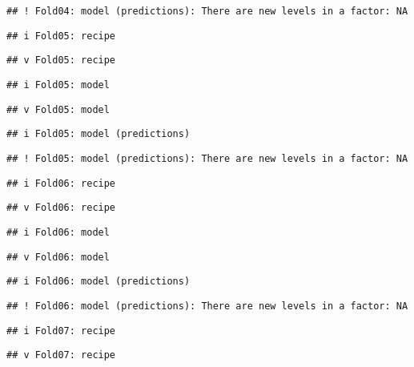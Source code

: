 \documentclass[
]{article}
\begin{document}
\begin{verbatim}
## ! Fold04: model (predictions): There are new levels in a factor: NA
\end{verbatim}

\begin{verbatim}
## i Fold05: recipe
\end{verbatim}

\begin{verbatim}
## v Fold05: recipe
\end{verbatim}

\begin{verbatim}
## i Fold05: model
\end{verbatim}

\begin{verbatim}
## v Fold05: model
\end{verbatim}

\begin{verbatim}
## i Fold05: model (predictions)
\end{verbatim}

\begin{verbatim}
## ! Fold05: model (predictions): There are new levels in a factor: NA
\end{verbatim}

\begin{verbatim}
## i Fold06: recipe
\end{verbatim}

\begin{verbatim}
## v Fold06: recipe
\end{verbatim}

\begin{verbatim}
## i Fold06: model
\end{verbatim}

\begin{verbatim}
## v Fold06: model
\end{verbatim}

\begin{verbatim}
## i Fold06: model (predictions)
\end{verbatim}

\begin{verbatim}
## ! Fold06: model (predictions): There are new levels in a factor: NA
\end{verbatim}

\begin{verbatim}
## i Fold07: recipe
\end{verbatim}

\begin{verbatim}
## v Fold07: recipe
\end{verbatim}
\end{document}
